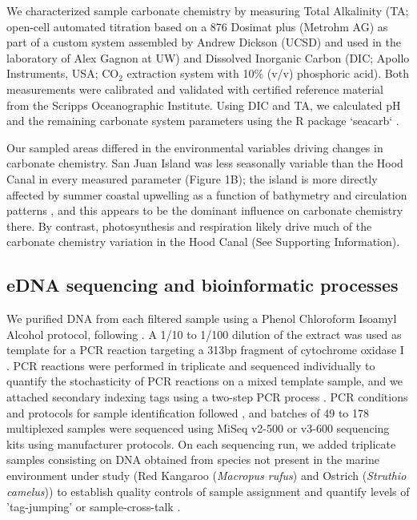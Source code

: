 \documentclass[11pt]{article}
\begin{document}
\begin{linenumbers}
We characterized sample carbonate chemistry by measuring Total Alkalinity (TA; open-cell automated titration based on a 876 Dosimat plus (Metrohm AG) as part of a custom system assembled by Andrew Dickson (UCSD) and used in the laboratory of Alex Gagnon at UW) and Dissolved Inorganic Carbon (DIC; Apollo Instruments, USA; CO$_2$ extraction system with 10\% (v/v) phosphoric acid). Both measurements were calibrated and validated with certified reference material from the Scripps Oceanographic Institute. Using DIC and TA, we calculated pH and the remaining carbonate system parameters using the R package `seacarb` \cite{seacarb}. 

Our sampled areas differed in the environmental variables driving changes in carbonate chemistry. San Juan Island was less seasonally variable than the Hood Canal in every measured parameter (Figure 1B); the island is more directly affected by summer coastal upwelling as a function of bathymetry and circulation patterns \cite{murray2015inland}, and this appears to be the dominant influence on carbonate chemistry there. By contrast, photosynthesis and respiration likely drive much of the carbonate chemistry variation in the Hood Canal (See Supporting Information). 

\subsection*{eDNA sequencing and bioinformatic processes}
We purified DNA from each filtered sample using a Phenol Chloroform Isoamyl Alcohol protocol, following \cite{renshaw2015room}. A 1/10 to 1/100 dilution of the extract was used as template for a PCR reaction targeting a 313bp fragment of cytochrome oxidase I \cite{leray_new_2013}. PCR reactions were performed in triplicate and sequenced individually to quantify the stochasticity of PCR reactions on a mixed template sample, and we attached secondary indexing tags using a two-step PCR process \cite{odonnellPrimers}. PCR conditions and protocols for sample identification followed \cite{kelly2018tides}, and batches of 49 to 178 multiplexed samples were sequenced using MiSeq v2-500 or v3-600 sequencing kits using manufacturer protocols. On each sequencing run, we added triplicate samples consisting on DNA obtained from species not present in the marine environment under study (Red Kangaroo (\textit{Macropus rufus}) and Ostrich (\textit{Struthio camelus})) to establish quality controls of sample assignment and quantify levels of 'tag-jumping' or sample-cross-talk \cite{schnell2015tag}. 


\end{linenumbers}
\end{document}
